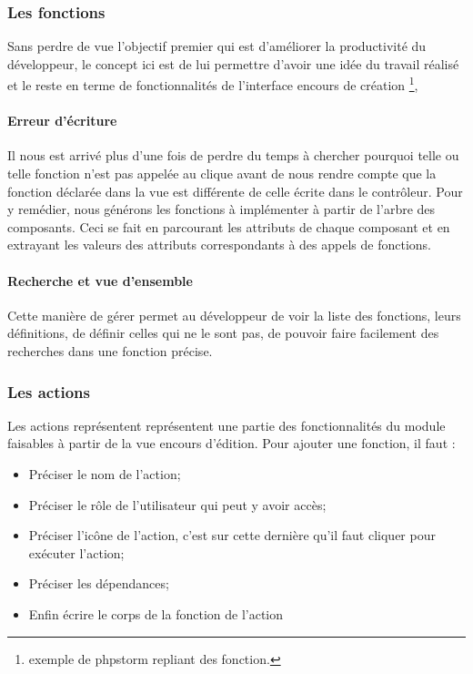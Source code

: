\documentclass[a4paper,12pt]{article}
\begin{document}
	

\subsubsection{ Les fonctions}
Sans perdre de vue l'objectif premier qui est d'améliorer la
productivité du développeur, le concept ici est de lui permettre
d'avoir une idée du travail réalisé et le reste en terme de
fonctionnalités de l'interface encours de création \footnote{exemple
  de phpstorm repliant des fonction.},
\paragraph{Erreur d'écriture}
 Il nous est arrivé plus d'une fois de perdre du temps à chercher
 pourquoi telle ou telle fonction n'est pas appelée au clique avant de
 nous rendre compte que la fonction déclarée dans la vue est
 différente de celle écrite dans le contrôleur. Pour y remédier, nous
 générons les fonctions à implémenter à partir de l'arbre des
 composants. Ceci se fait en parcourant les attributs de chaque
 composant et en extrayant les valeurs des attributs correspondants à
 des appels de fonctions.
\paragraph{Recherche et vue d'ensemble}
Cette manière de gérer permet au développeur de voir la liste des
fonctions, leurs définitions, de définir celles qui ne le sont pas, de
pouvoir faire facilement des recherches dans une fonction précise.
\subsubsection{ Les actions}
Les actions représentent représentent une partie des fonctionnalités
du module faisables à partir de la vue encours d'édition.  Pour
ajouter une fonction, il faut :
\begin{itemize}
\item Préciser le nom de l'action;
\item  Préciser le rôle de l'utilisateur qui peut y avoir accès;
\item Préciser l'icône  de l'action, c'est sur cette dernière qu'il faut cliquer pour exécuter l'action;
\item Préciser les dépendances;
\item Enfin écrire le corps de la fonction de l'action
\end{itemize}
\end{document}
